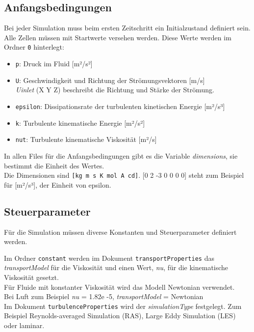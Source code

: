 \subsection{Anfangsbedingungen \label{openfoam:section:Anfangsbedingungen}}
Bei jeder Simulation muss beim ersten Zeitschritt ein Initialzustand definiert sein.
Alle Zellen müssen mit Startwerte versehen werden.
Diese Werte werden im Ordner \texttt{0} hinterlegt:

\begin{itemize}
    \item \texttt{p}: Druck im Fluid [m²/s²]
    \item \texttt{U}: Geschwindigkeit und Richtung der Strömungsvektoren [m/s]\\
    \textit{Uinlet} (X Y Z) beschreibt die Richtung und Stärke der Strömung. 
    \item \texttt{epsilon}: Dissipationsrate der turbulenten kinetischen Energie [m²/s³]
    \item \texttt{k}: Turbulente kinematische Energie [m²/s²]
    \item \texttt{nut}: Turbulente kinematische Viskosität [m²/s]
\end{itemize}

In allen Files für die Anfangsbedingungen gibt es die Variable \textit{dimensions}, sie bestimmt die Einheit des Wertes.\\
Die Dimensionen sind \texttt{[kg m s K mol A cd]}.
[0 2 -3 0 0 0 0] steht zum Beispiel für [m²/s³], der Einheit von epsilon.

\subsection{Steuerparameter \label{openfoam:section:Steuerparameter}}
Für die Simulation müssen diverse Konstanten und Steuerparameter definiert werden.

Im Ordner \texttt{constant} werden im Dokument \texttt{transportProperties} das \textit{transportModel} für die Viskosität und einen Wert, \textit{nu}, für die kinematische Viskosität gesetzt.\\
Für Fluide mit konstanter Viskosität wird das Modell Newtonian verwendet.\\
Bei Luft zum Beispiel \textit{nu} = 1.82e -5, \textit{transportModel} = Newtonian\\

Im Dokument \texttt{turbulenceProperties} wird der \textit{simulationType} festgelegt.
Zum Beispiel Reynolds-averaged Simulation (RAS), Large Eddy Simulation (LES) oder laminar.\\

